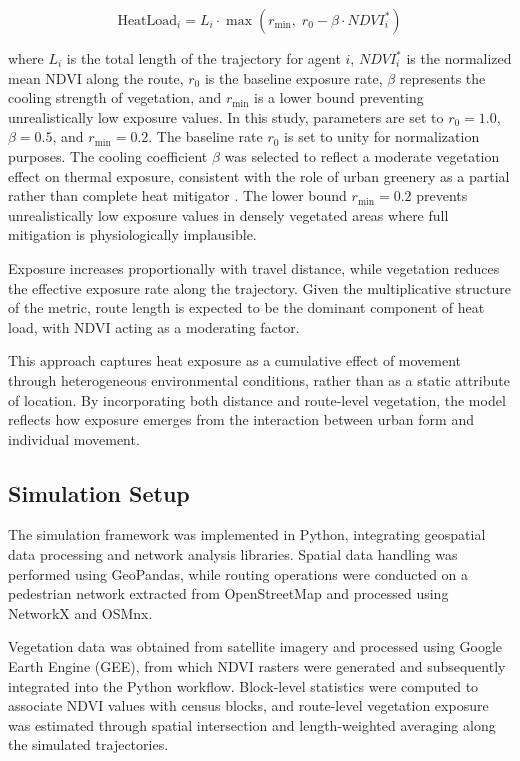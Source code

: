 \documentclass{wscpaperproc}
\theoremstyle{wsc}
\begin{document}
\[
\text{HeatLoad}_i = L_i \cdot \max\left(r_{\min},\; r_0 - \beta \cdot NDVI_i^{*}\right)
\]

where \(L_i\) is the total length of the trajectory for agent \(i\), \(NDVI_i^{*}\) is the normalized mean NDVI along the route, \(r_0\) is the baseline exposure rate, \(\beta\) represents the cooling strength of vegetation, and \(r_{\min}\) is a lower bound preventing unrealistically low exposure values. 
In this study, parameters are set to \(r_0 = 1.0\), \(\beta = 0.5\), and \(r_{\min} = 0.2\). The baseline rate \(r_0 \) is set to unity for normalization purposes. The cooling coefficient \(\beta\) was selected to reflect a moderate vegetation effect on thermal exposure, consistent with the role of urban greenery as a partial rather than complete heat mitigator \cite{schwaab2021urban}. The lower bound \(r_{\min} = 0.2\) prevents unrealistically low exposure values in densely vegetated areas where full mitigation is physiologically implausible. 


Exposure increases proportionally with travel distance, while vegetation reduces the effective exposure rate along the trajectory. Given the multiplicative structure of the metric, route length is expected to be the dominant component of heat load, with NDVI acting as a moderating factor.

This approach captures heat exposure as a cumulative effect of movement through heterogeneous environmental conditions, rather than as a static attribute of location. By incorporating both distance and route-level vegetation, the model reflects how exposure emerges from the interaction between urban form and individual movement.

\subsection{Simulation Setup}

The simulation framework was implemented in Python, integrating geospatial data processing and network analysis libraries. Spatial data handling was performed using GeoPandas, while routing operations were conducted on a pedestrian network extracted from OpenStreetMap and processed using NetworkX and OSMnx.

Vegetation data was obtained from satellite imagery and processed using Google Earth Engine (GEE), from which NDVI rasters were generated and subsequently integrated into the Python workflow. Block-level statistics were computed to associate NDVI values with census blocks, and route-level vegetation exposure was estimated through spatial intersection and length-weighted averaging along the simulated trajectories.
\end{document}

